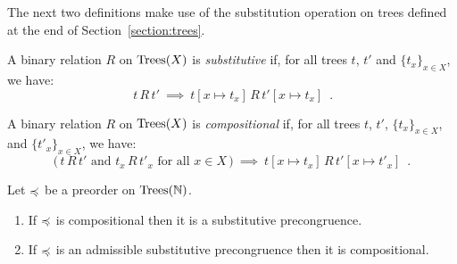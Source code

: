 \noindent
The next two definitions make use of the substitution operation on trees defined at the end of
Section~\ref{section:trees}.
\begin{definition}[Substitutive]
    A binary relation $R$ on $\textnormal{Trees}(X)$ is  \emph{substitutive} if,
    for all trees $t$, $t'$ and $\{t_x\}_{x \in X}$, we have:
    \[ \text{$\,t\, R \, t'$} ~ \implies ~ 
       t[ x \mapsto t_x] \, R \, t'[ x \mapsto t_x] \enspace .
    \]
\end{definition}



\begin{definition}[Compositionality]
    A binary relation $R$ on $\textnormal{Trees}(X)$ is \emph{compositional} if, for all 
    trees $t$, $t'$,  $\{t_x\}_{x \in X}$,  and $\{t'_x\}_{x \in X}$, we have:
        \[ \text{($\,t \, R \, t'$ and $t_x \, R \, t'_x$ for all $x \in X\,$)} ~ \implies ~ 
        t[ x \mapsto t_x] \, R \, t'[ x \mapsto t'_x] \enspace .
    \]
\end{definition}



\begin{proposition} Let $\preccurlyeq$ be a preorder  on $\textnormal{Trees}(\mathbb{N})$.
\begin{enumerate} 
\item If  $\preccurlyeq$ is compositional then it is a substitutive precongruence.
\item If $\preccurlyeq$ is an admissible substitutive precongruence then it is compositional.
\end{enumerate}
\end{proposition}

